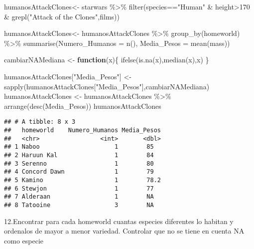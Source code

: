 \documentclass[
]{book}
\newenvironment{Shaded}{\begin{snugshade}}{\end{snugshade}}
\newcommand{\AttributeTok}[1]{\textcolor[rgb]{0.77,0.63,0.00}{#1}}
\newcommand{\ControlFlowTok}[1]{\textcolor[rgb]{0.13,0.29,0.53}{\textbf{#1}}}
\newcommand{\DecValTok}[1]{\textcolor[rgb]{0.00,0.00,0.81}{#1}}
\newcommand{\FunctionTok}[1]{\textcolor[rgb]{0.00,0.00,0.00}{#1}}
\newcommand{\NormalTok}[1]{#1}
\newcommand{\OtherTok}[1]{\textcolor[rgb]{0.56,0.35,0.01}{#1}}
\newcommand{\SpecialCharTok}[1]{\textcolor[rgb]{0.00,0.00,0.00}{#1}}
\newcommand{\StringTok}[1]{\textcolor[rgb]{0.31,0.60,0.02}{#1}}
\begin{document}
\begin{Shaded}
\begin{Highlighting}[]
\NormalTok{humanosAttackClones}\OtherTok{\textless{}{-}}\NormalTok{ starwars }\SpecialCharTok{\%\textgreater{}\%} \FunctionTok{filter}\NormalTok{(species}\SpecialCharTok{==}\StringTok{"Human"} \SpecialCharTok{\&}\NormalTok{ height}\SpecialCharTok{\textgreater{}}\DecValTok{170} \SpecialCharTok{\&} \FunctionTok{grepl}\NormalTok{(}\StringTok{"Attack of the Clones"}\NormalTok{,films))}
 
\NormalTok{humanosAttackClones}\OtherTok{\textless{}{-}}\NormalTok{ humanosAttackClones }\SpecialCharTok{\%\textgreater{}\%} \FunctionTok{group\_by}\NormalTok{(homeworld) }\SpecialCharTok{\%\textgreater{}\%} \FunctionTok{summarise}\NormalTok{(}\AttributeTok{Numero\_Humanos =} \FunctionTok{n}\NormalTok{(), }\AttributeTok{Media\_Pesos =} \FunctionTok{mean}\NormalTok{(mass))}

\NormalTok{cambiarNAMediana }\OtherTok{\textless{}{-}} \ControlFlowTok{function}\NormalTok{(x)\{}
  \FunctionTok{ifelse}\NormalTok{(}\FunctionTok{is.na}\NormalTok{(x),}\FunctionTok{median}\NormalTok{(x),x)}
\NormalTok{\}}

\NormalTok{humanosAttackClones[}\StringTok{"Media\_Pesos"}\NormalTok{] }\OtherTok{\textless{}{-}} \FunctionTok{sapply}\NormalTok{(humanosAttackClones[}\StringTok{"Media\_Pesos"}\NormalTok{],cambiarNAMediana)}
\NormalTok{humanosAttackClones }\OtherTok{\textless{}{-}}\NormalTok{ humanosAttackClones }\SpecialCharTok{\%\textgreater{}\%} \FunctionTok{arrange}\NormalTok{(}\FunctionTok{desc}\NormalTok{(Media\_Pesos))}
\NormalTok{humanosAttackClones}
\end{Highlighting}
\end{Shaded}

\begin{verbatim}
## # A tibble: 8 x 3
##   homeworld    Numero_Humanos Media_Pesos
##   <chr>                 <int>       <dbl>
## 1 Naboo                     1        85  
## 2 Haruun Kal                1        84  
## 3 Serenno                   1        80  
## 4 Concord Dawn              1        79  
## 5 Kamino                    1        78.2
## 6 Stewjon                   1        77  
## 7 Alderaan                  1        NA  
## 8 Tatooine                  3        NA
\end{verbatim}

12.Encontrar para cada homeworld cuantas especies diferentes lo habitan y ordenalos de mayor a menor variedad. Controlar que no se tiene en cuenta NA como especie
\end{document}
